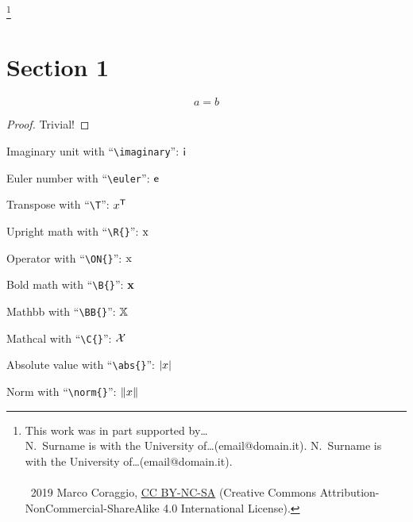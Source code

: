 \documentclass[authorrefs]{lib/SMarticle}
\begin{document}
\thanks{%
  This work was in part supported by\dots\\
  N.~Surname is with the University of\dots (email@domain.it).
  N.~Surname is with the University of\dots (email@domain.it).\\
  \\
  \textcopyright\ 2019 Marco Coraggio, \href{https://creativecommons.org/licenses/by-nc-sa/4.0/}{CC BY-NC-SA} (Creative Commons Attribution-NonCommercial-ShareAlike 4.0 International License).
}
\maketitle
\thispagestyle{firstpage}  %
\begin{abstract}
  In this document, \dots
\end{abstract}

\tableofcontents


\section{Section 1}%
\label{sec:section_1}

\cite{smith2024interesting}
\begin{theorem}[My theorem]
  \begin{equation}
    a = b
  \end{equation}
\end{theorem}
%
\begin{proof}
  Trivial!
\end{proof}

Imaginary unit with ``\texttt{\textbackslash imaginary}'': $\mathsf{i}$ \par
Euler number with ``\texttt{\textbackslash euler}'': $\mathsf{e}$ \par
Transpose with ``\texttt{\textbackslash T}'': $x^{\mathsf{T}}$ \par
Upright math with ``\texttt{\textbackslash R\{\}}'': $\mathrm{x}$ \par
Operator with ``\texttt{\textbackslash ON\{\}}'': $\operatorname{x}$ \par
Bold math with ``\texttt{\textbackslash B\{\}}'': $\B{x}$ \par
Mathbb with ``\texttt{\textbackslash BB\{\}}'': $\mathbb{X}$ \par
Mathcal with ``\texttt{\textbackslash C\{\}}'': $\mathcal{X}$ \par
Absolute value with ``\texttt{\textbackslash abs\{\}}'': $\left\lvert x \right\rvert$ \par
Norm with ``\texttt{\textbackslash norm\{\}}'': $\left\lVert x \right\rVert$ \par
\end{document}
